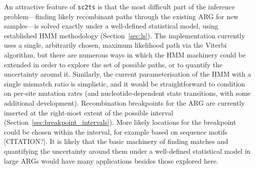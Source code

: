 \documentclass{article}
\begin{document}
An attractive feature of \texttt{sc2ts} is that the most difficult part of
the inference problem---finding likely recombinant paths through the existing ARG
for new samples---is solved exactly under a well-defined statistical model,
using established HMM methodology (Section~\ref{sec:ls}).
The implementation currently uses
a single, arbitrarily chosen, maximum likelihood path via the
Viterbi algorithm, but there are numerous ways in which the HMM machinery
could be extended in order to explore the set of possible paths, or to
quantify the uncertainty around it. Similarly, the current parameterisation
of the HMM with a single mismatch ratio is simplistic, and it would
be straightforward to condition on per-site mutation rates (and nucleotide-dependent
state transitions, with some additional development).
Recombination breakpoints for the ARG are currently inserted at the
right-most extent of the possible interval
(Section~\ref{sec:breakpoint_intervals}). More likely locations for the
breakpoint could be chosen within the interval, for example based
on sequence motifs [CITATION?].
It is likely that the basic machinery of finding matches and quantifying
the uncertainty around them under a well-defined statistical model
in large ARGs would have many applications besides those explored here.
\end{document}
